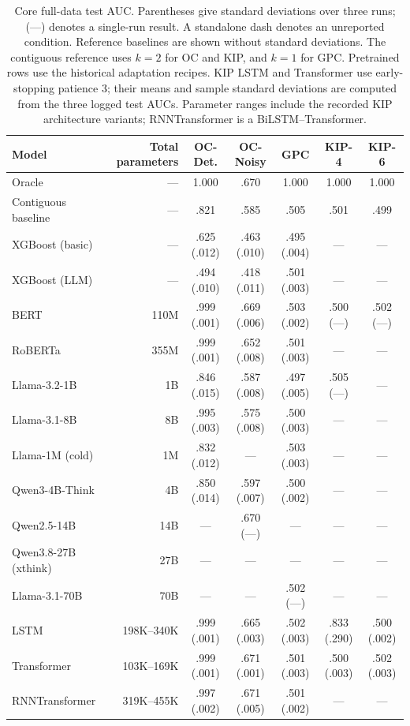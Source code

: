 \begin{table}[htbp]
\centering\small
\caption{Core full-data test AUC. Parentheses give standard deviations
over three runs; (---) denotes a single-run result. A standalone dash
denotes an unreported condition. Reference baselines are shown without
standard deviations. The contiguous reference uses $k=2$ for OC and KIP,
and $k=1$ for GPC. Pretrained rows use the historical adaptation recipes.
KIP LSTM and Transformer use early-stopping patience 3; their means and
sample standard deviations are computed from the three logged test AUCs.
Parameter ranges include the recorded KIP architecture variants;
RNNTransformer is a BiLSTM--Transformer.}
\label{tab:results_full}\label{tab:models}
\begin{tabular}{@{}lrccccc@{}}
\toprule
Model & Total parameters & OC-Det. & OC-Noisy & GPC & KIP-4 & KIP-6\\
\midrule
Oracle & --- & 1.000 & .670 & 1.000 & 1.000 & 1.000\\
Contiguous baseline & --- & .821 & .585 & .505 & .501 & .499\\
XGBoost (basic) & --- & .625 (.012) & .463 (.010) & .495 (.004) & --- & ---\\
XGBoost (LLM) & --- & .494 (.010) & .418 (.011) & .501 (.003) & --- & ---\\
BERT & 110M & .999 (.001) & .669 (.006) & .503 (.002) & .500 (---) & .502 (---)\\
RoBERTa & 355M & .999 (.001) & .652 (.008) & .501 (.003) & --- & ---\\
Llama-3.2-1B & 1B & .846 (.015) & .587 (.008) & .497 (.005) & .505 (---) & ---\\
Llama-3.1-8B & 8B & .995 (.003) & .575 (.008) & .500 (.003) & --- & ---\\
Llama-1M (cold) & 1M & .832 (.012) & --- & .503 (.003) & --- & ---\\
Qwen3-4B-Think & 4B & .850 (.014) & .597 (.007) & .500 (.002) & --- & ---\\
Qwen2.5-14B & 14B & --- & .670 (---) & --- & --- & ---\\
Qwen3.8-27B (xthink) & 27B & --- & --- & --- & --- & ---\\
Llama-3.1-70B & 70B & --- & --- & .502 (---) & --- & ---\\
LSTM & 198K--340K & .999 (.001) & .665 (.003) & .502 (.003) & .833 (.290) & .500 (.002)\\
Transformer & 103K--169K & .999 (.001) & .671 (.001) & .501 (.003) & .500 (.003) & .502 (.003)\\
RNNTransformer & 319K--455K & .997 (.002) & .671 (.005) & .501 (.002) & --- & ---\\
\bottomrule
\end{tabular}
\end{table}
